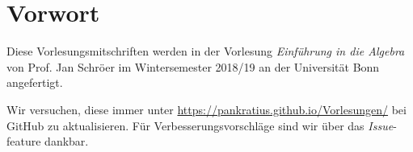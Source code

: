 \chapter*{Vorwort}
Diese Vorlesungsmitschriften werden in der Vorlesung \textit{Einführung in die Algebra} von Prof. Jan Schröer im Wintersemester 2018/19 an der Universität Bonn angefertigt.\par
Wir versuchen, diese immer unter \url{https://pankratius.github.io/Vorlesungen/} bei GitHub zu aktualisieren. Für Verbesserungsvorschläge sind wir über das \textit{Issue}-feature dankbar.